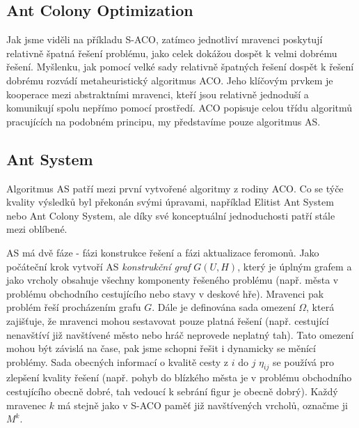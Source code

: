 \documentclass[12pt]{article}
\begin{document}
\subsection{Ant Colony Optimization}
Jak jsme viděli na příkladu \ac{S-ACO}, zatímco jednotliví mravenci poskytují relativně špatná řešení problému, jako celek dokážou dospět k velmi dobrému řešení. Myšlenku, jak pomocí velké sady relativně špatných řešení dospět k řešení dobrému rozvádí metaheuristický algoritmus \ac{ACO}. Jeho klíčovým prvkem je kooperace mezi abstraktními mravenci, kteří jsou relativně jednoduší a komunikují spolu nepřímo pomocí prostředí. \ac{ACO} popisuje celou třídu algoritmů pracujících na podobném principu, my představíme pouze algoritmus \ac{AS}.

\subsection{Ant System}
Algoritmus \ac{AS} patří mezi první vytvořené algoritmy z rodiny \ac{ACO}. Co se týče kvality výsledků byl překonán svými úpravami, například Elitist Ant System nebo Ant Colony System, ale díky své konceptuální jednoduchosti patří stále mezi oblíbené.

\ac{AS} má dvě fáze - fázi konstrukce řešení a fázi aktualizace feromonů. Jako počáteční krok vytvoří \ac{AS} \emph{konstrukční graf} $G(U, H)$, který je úplným grafem a jako vrcholy obsahuje všechny komponenty řešeného problému (např. města v problému obchodního cestujícího nebo stavy v deskové hře). Mravenci pak problém řeší procházením grafu $G$. Dále je definována sada omezení $\Omega$, která zajišťuje, že mravenci mohou sestavovat pouze platná řešení (např. cestující nenavštíví již navštívené město nebo hráč neprovede neplatný tah). Tato omezení mohou být závislá na čase, pak jsme schopni řešit i dynamicky se měnící problémy. Sada obecných informací o kvalitě cesty z $i$ do $j$ $\eta_{ij}$ se používá pro zlepšení kvality řešení (např. pohyb do blízkého města je v problému obchodního cestujícího obecně dobré, tah vedoucí k sebrání figur je obecně dobrý). Každý mravenec $k$ má stejně jako v \ac{S-ACO} paměť již navštívených vrcholů, označme ji $M^k$.
\end{document}
